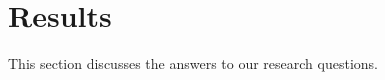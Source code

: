 \section{Results} \label{results}

This section discusses the answers to our research questions.
\vspace{-0.2cm}





%
